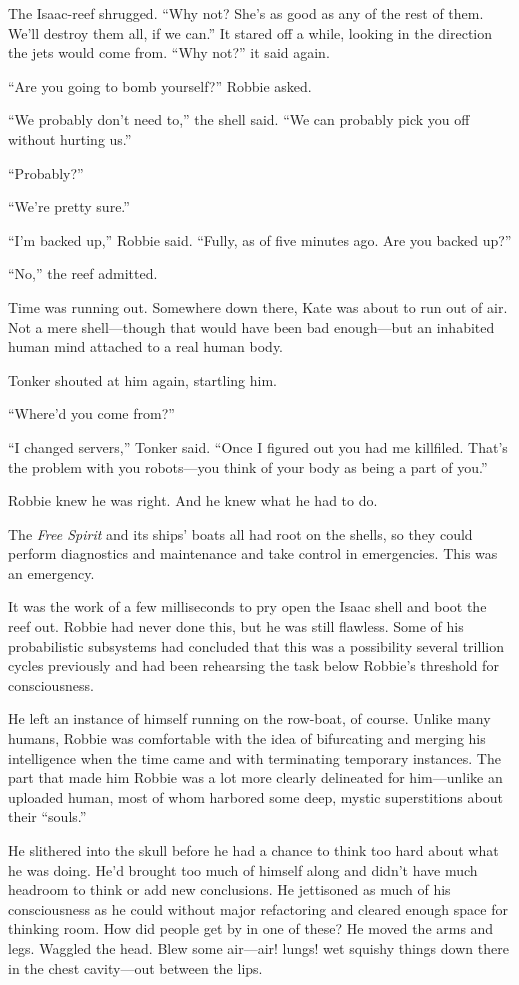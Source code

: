 The Isaac-reef shrugged. “Why not? She’s as good as any of the rest
of them. We’ll destroy them all, if we can.” It stared off a while,
looking in the direction the jets would come from. “Why not?” it
said again.

“Are you going to bomb yourself?” Robbie asked.

“We probably don’t need to,” the shell said. “We can probably pick
you off without hurting us.”

“Probably?”

“We’re pretty sure.”

“I’m backed up,” Robbie said. “Fully, as of five minutes ago. Are
you backed up?”

“No,” the reef admitted.

Time was running out. Somewhere down there, Kate was about to run
out of air. Not a mere shell—though that would have been bad
enough—but an inhabited human mind attached to a real human body.

Tonker shouted at him again, startling him.

“Where’d you come from?”

“I changed servers,” Tonker said. “Once I figured out you had me
killfiled. That’s the problem with you robots—you think of your
body as being a part of you.”

Robbie knew he was right. And he knew what he had to do.

The \emph{Free Spirit} and its ships’ boats all had root on the
shells, so they could perform diagnostics and maintenance and take
control in emergencies. This was an emergency.

It was the work of a few milliseconds to pry open the Isaac shell
and boot the reef out. Robbie had never done this, but he was still
flawless. Some of his probabilistic subsystems had concluded that
this was a possibility several trillion cycles previously and had
been rehearsing the task below Robbie’s threshold for
consciousness.

He left an instance of himself running on the row-boat, of course.
Unlike many humans, Robbie was comfortable with the idea of
bifurcating and merging his intelligence when the time came and
with terminating temporary instances. The part that made him Robbie
was a lot more clearly delineated for him—unlike an uploaded human,
most of whom harbored some deep, mystic superstitions about their
“souls.”

He slithered into the skull before he had a chance to think too
hard about what he was doing. He’d brought too much of himself
along and didn’t have much headroom to think or add new
conclusions. He jettisoned as much of his consciousness as he could
without major refactoring and cleared enough space for thinking
room. How did people get by in one of these? He moved the arms and
legs. Waggled the head. Blew some air—air! lungs! wet squishy
things down there in the chest cavity—out between the lips.

